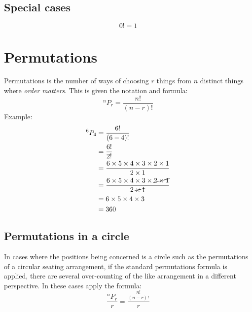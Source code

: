 \documentclass[a4paper,10pt]{report}
\begin{document}
		\subsection{Special cases}
			$$0! = 1$$


	\section{Permutations}
		Permutations is the number of ways of choosing $r$ things from $n$ distinct things where \emph{order matters}.  This is given the notation and formula:
		$$
			^nP_r = \frac{n!}{(n-r)!}
		$$
		Example:\\
		\begin{align*}
			^6P_4 & = \frac{6!}{(6 - 4)!} \\
			      & = \frac{6!}{2!} \\
			      & = \frac{6 \times 5 \times 4 \times 3 \times 2 \times 1}{2 \times 1} \\
			      & = \frac{6 \times 5 \times 4 \times 3 \times \cancel{2 \times 1}}{\cancel{2 \times 1}} \\
			      & = 6 \times 5 \times 4 \times 3 \\
			      & = 360
		\end{align*}

		\subsection{Permutations in a circle}
			In cases where the positions being concerned is a circle such as the permutations of a circular seating arrangement, if the standard permutations formula is applied, there are several over-counting of the like arrangement in a different perspective.  In these cases apply the formula:
			$$
				\frac{^nP_r}{r} = \frac{\frac{n!}{(n-r)!}}{r}
			$$
\end{document}
